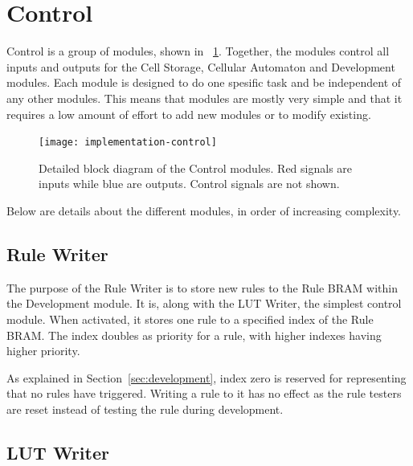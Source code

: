 

\section{Control}

Control is a group of modules, shown in \figurename~\ref{fig:implementation-control}.
Together, the modules control all inputs and outputs for the Cell Storage, Cellular Automaton and Development modules.
Each module is designed to do one spesific task and be independent of any other modules.
This means that modules are mostly very simple and that it requires a low amount of effort to add new modules or to modify existing.

\begin{figure}[!ht]
    \centering
    \texttt{[image: implementation-control]}
    \caption[Control modules]{
        Detailed block diagram of the Control modules.
        Red signals are inputs while blue are outputs.
        Control signals are not shown.
    }
    \label{fig:implementation-control}
\end{figure}

Below are details about the different modules, in order of increasing complexity.

\subsection{Rule Writer}

The purpose of the Rule Writer is to store new rules to the Rule BRAM within the Development module.
It is, along with the LUT Writer, the simplest control module.
When activated, it stores one rule to a specified index of the Rule BRAM.
The index doubles as priority for a rule, with higher indexes having higher priority.

As explained in Section~\ref{sec:development}, index zero is reserved for representing that no rules have triggered.
Writing a rule to it has no effect as the rule testers are reset instead of testing the rule during development.

\subsection{LUT Writer}

